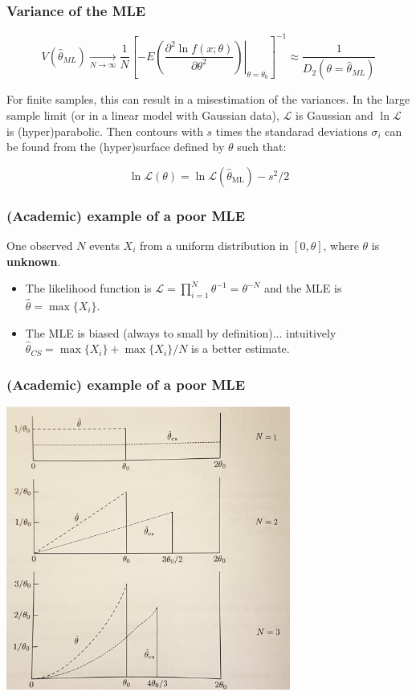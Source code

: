 \documentclass[9pt]{beamer}
\begin{document}
\begin{frame}
 \frametitle{Variance of the MLE}
 
 $$V(\hat{\theta}_{ML}) \xrightarrow[N\to\infty]{} \frac{1}{N} \left[ \left.-E\left(\frac{\partial^2\ln f(x;\theta)}{\partial \theta^2}\right)\right|_{\theta=\theta_0} \right]^{-1} \approx \frac{1}{D_2(\theta=\hat{\theta}_{ML})}$$
 
 \vspace{20pt}
 
 For finite samples, this can result in a misestimation of the variances. In the large sample limit (or in a linear model with Gaussian data), $\mathcal{L}$ is Gaussian and $\ln\mathcal{L}$ is (hyper)parabolic. Then contours with $s$ times the standarad deviations $\sigma_i$ can be found from the (hyper)surface defined by $\theta$ such that:
 
 $$\ln\mathcal{L}(\theta) = \ln\mathcal{L}(\hat{\theta}_\text{ML}) - s^2/2$$
 
\end{frame}

\begin{frame}
 \frametitle{(Academic) example of a poor MLE}
 
 One observed $N$ events $X_i$ from a uniform distribution in $[0,\theta]$, where $\theta$ is \textbf{unknown}. 
 
 \begin{itemize}
  \item The likelihood function is $\mathcal{L} = \prod_{i=1}^N \theta^{-1} = \theta^{-N}$ and the MLE is $\hat{\theta} = \max\{X_i\}$.
  \item The MLE is biased (always to small by definition)... intuitively $\hat{\theta}_{CS} = \max\{X_i\} + \max\{X_i\}/N$ is a better estimate.
 \end{itemize}
\end{frame}

\begin{frame}
 \frametitle{(Academic) example of a poor MLE}
 
 \begin{center}
  \includegraphics[width=0.7\textwidth]{academic_MLE.jpg}
 \end{center}

\end{frame}
\end{document}
